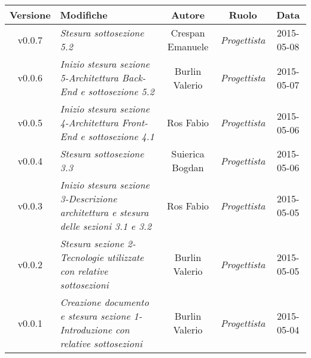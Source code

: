 \newpage

\begin{table}[h]
\centering
\begin{tabular}{|c|p{}|c|c|c|}
	\toprule
	\textbf{Versione} & \textbf{Modifiche} & \textbf{Autore} & \textbf{Ruolo} & \textbf{Data} \\
	\midrule
	\midrule
	v0.0.7 & \textit{Stesura sottosezione 5.2} & Crespan Emanuele & \textit{Progettista} & 2015-05-08\\
	\midrule
	v0.0.6 & \textit{Inizio stesura sezione 5-Architettura Back-End e sottosezione 5.2} & Burlin Valerio & \textit{Progettista} & 2015-05-07\\
	\midrule
	v0.0.5 & \textit{Inizio stesura sezione 4-Architettura Front-End e sottosezione 4.1} & Ros Fabio & \textit{Progettista} & 2015-05-06\\
	\midrule
	v0.0.4 & \textit{Stesura sottosezione 3.3} & Suierica Bogdan & \textit{Progettista} & 2015-05-06\\
	\midrule
		v0.0.3 & \textit{Inizio stesura sezione 3-Descrizione architettura e stesura delle sezioni 3.1 e 3.2} & Ros Fabio & \textit{Progettista} & 2015-05-05\\
	\midrule
		v0.0.2 & \textit{Stesura sezione 2-Tecnologie utilizzate con relative sottosezioni} & Burlin Valerio & \textit{Progettista} & 2015-05-05\\
	\midrule
		v0.0.1 & \textit{Creazione documento e stesura sezione 1-Introduzione con relative sottosezioni} & Burlin Valerio & \textit{Progettista} & 2015-05-04\\
	\bottomrule
\end{tabular}
\end{table}
\newpage
